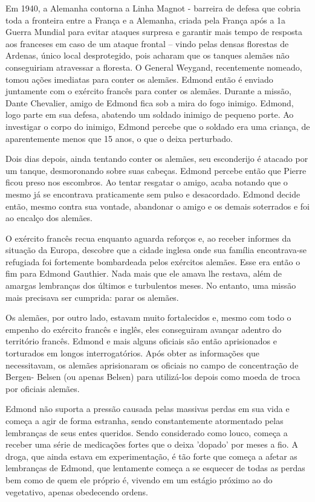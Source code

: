 \documentclass{article}
\begin{document}
    Em 1940, a Alemanha contorna a Linha Magnot - barreira de defesa que cobria toda a fronteira entre a França e a Alemanha, criada pela França após a 1a Guerra Mundial para evitar ataques surpresa e garantir mais tempo de resposta aos franceses em caso de um ataque frontal – vindo pelas densas florestas de Ardenas, único local desprotegido, pois acharam que os tanques alemães não conseguiriam atravessar a floresta. O General Weygand, recentemente nomeado, tomou ações imediatas para conter os alemães. Edmond então é enviado juntamente com o exército francês para conter os alemães. Durante a missão, Dante Chevalier, amigo de Edmond fica sob a mira do fogo inimigo. Edmond, logo parte em sua defesa, abatendo um soldado inimigo de pequeno porte. Ao investigar o corpo do inimigo, Edmond percebe que o soldado era uma criança, de aparentemente menos que 15 anos, o que o deixa perturbado. 
    
    Dois dias depois, ainda tentando conter os alemães, seu esconderijo é atacado por um tanque, desmoronando sobre suas cabeças. Edmond percebe então que Pierre ficou preso nos escombros. Ao tentar resgatar o amigo, acaba notando que o mesmo já se encontrava praticamente sem pulso e desacordado. Edmond decide então, mesmo contra sua vontade, abandonar o amigo e os demais soterrados e foi ao encalço dos alemães.
    
    O exército francês recua enquanto aguarda reforços e, ao receber informes da situação da Europa, descobre que a cidade inglesa onde sua família encontrava-se refugiada foi fortemente bombardeada pelos exércitos alemães. Esse era então o fim para Edmond Gauthier. Nada mais que ele amava lhe restava, além de amargas lembranças dos últimos e turbulentos meses. No entanto, uma missão mais precisava ser cumprida: parar os alemães.
    
    Os alemães, por outro lado, estavam muito fortalecidos e, mesmo com todo o empenho do exército francês e inglês, eles conseguiram avançar adentro do território francês. Edmond e mais alguns oficiais são então aprisionados e torturados em longos interrogatórios. Após obter as informações que necessitavam, os alemães aprisionaram os oficiais no campo de concentração de Bergen- Belsen (ou apenas Belsen) para utilizá-los depois como moeda de troca por oficiais alemães.
    
    Edmond não suporta a pressão causada pelas massivas perdas em sua vida e começa a agir de forma estranha, sendo constantemente atormentado pelas lembranças de seus entes queridos. Sendo considerado como louco, começa a receber uma série de medicações fortes que o deixa 'dopado' por meses a fio. A droga, que ainda estava em experimentação,  é tão forte que começa a afetar as lembranças de Edmond, que lentamente começa a se esquecer de todas as perdas bem como de quem ele próprio é, vivendo em um estágio próximo ao do vegetativo, apenas obedecendo ordens.
    
\end{document}
